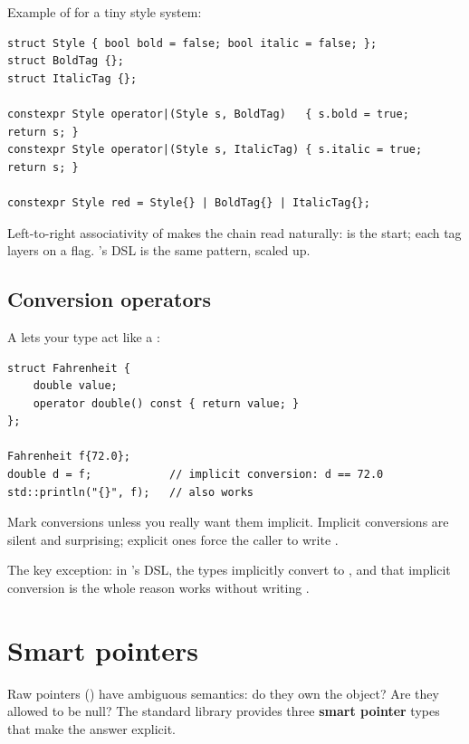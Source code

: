 Example of  for a tiny style system:

\begin{lstlisting}
struct Style { bool bold = false; bool italic = false; };
struct BoldTag {};
struct ItalicTag {};

constexpr Style operator|(Style s, BoldTag)   { s.bold = true;   return s; }
constexpr Style operator|(Style s, ItalicTag) { s.italic = true; return s; }

constexpr Style red = Style{} | BoldTag{} | ItalicTag{};
\end{lstlisting}

Left-to-right associativity of \code{|} makes the chain read
naturally:  is the start; each tag layers on a flag.
\maya{}'s DSL is the same pattern, scaled up.

\subsection{Conversion operators}

A  lets your type act like a :

\begin{lstlisting}
struct Fahrenheit {
    double value;
    operator double() const { return value; }
};

Fahrenheit f{72.0};
double d = f;            // implicit conversion: d == 72.0
std::println("{}", f);   // also works
\end{lstlisting}

Mark conversions  unless you really want them
implicit. Implicit conversions are silent and surprising; explicit
ones force the caller to write .

The key exception: in \maya{}'s DSL, the  types
implicitly convert to , and that implicit conversion is
the whole reason  works without writing
.

\section{Smart pointers}
\label{sec:cpp:smartptr}

Raw pointers () have ambiguous semantics: do they own the
object? Are they allowed to be null? The standard library provides
three \textbf{smart pointer} types that make the answer explicit.

\subsection{}

